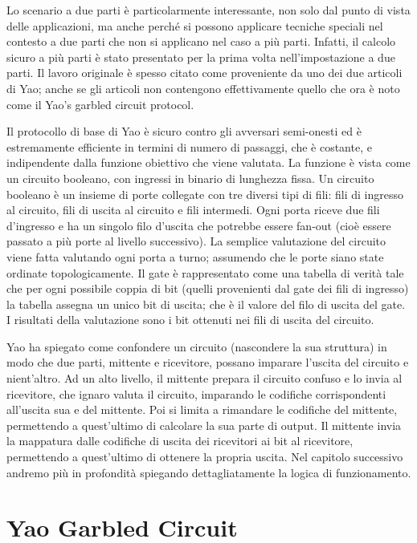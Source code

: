 \documentclass[
  italian,
]{book}
\begin{document}
Lo scenario a due parti è particolarmente interessante, non solo dal punto di vista delle applicazioni, ma anche perché si possono applicare tecniche speciali nel contesto a due parti che non si applicano nel caso a più parti. Infatti, il calcolo sicuro a più parti è stato presentato per la prima volta nell'impostazione a due parti. Il lavoro originale è spesso citato come proveniente da uno dei due articoli di Yao; anche se gli articoli non contengono effettivamente quello che ora è noto come il Yao's garbled circuit protocol.

Il protocollo di base di Yao è sicuro contro gli avversari semi-onesti ed è estremamente efficiente in termini di numero di passaggi, che è costante, e indipendente dalla funzione obiettivo che viene valutata. La funzione è vista come un circuito booleano, con ingressi in binario di lunghezza fissa. Un circuito booleano è un insieme di porte collegate con tre diversi tipi di fili: fili di ingresso al circuito, fili di uscita al circuito e fili intermedi. Ogni porta riceve due fili d'ingresso e ha un singolo filo d'uscita che potrebbe essere fan-out (cioè essere passato a più porte al livello successivo). La semplice valutazione del circuito viene fatta valutando ogni porta a turno; assumendo che le porte siano state ordinate topologicamente. Il gate è rappresentato come una tabella di verità tale che per ogni possibile coppia di bit (quelli provenienti dal gate dei fili di ingresso) la tabella assegna un unico bit di uscita; che è il valore del filo di uscita del gate. I risultati della valutazione sono i bit ottenuti nei fili di uscita del circuito.

Yao ha spiegato come confondere un circuito (nascondere la sua struttura) in modo che due parti, mittente e ricevitore, possano imparare l'uscita del circuito e nient'altro. Ad un alto livello, il mittente prepara il circuito confuso e lo invia al ricevitore, che ignaro valuta il circuito, imparando le codifiche corrispondenti all'uscita sua e del mittente. Poi si limita a rimandare le codifiche del mittente, permettendo a quest'ultimo di calcolare la sua parte di output. Il mittente invia la mappatura dalle codifiche di uscita dei ricevitori ai bit al ricevitore, permettendo a quest'ultimo di ottenere la propria uscita. Nel capitolo successivo andremo più in profondità spiegando dettagliatamente la logica di funzionamento.

\hypertarget{yao-garbled-circuit}{%
\chapter{Yao Garbled Circuit}\label{yao-garbled-circuit}}
\end{document}
